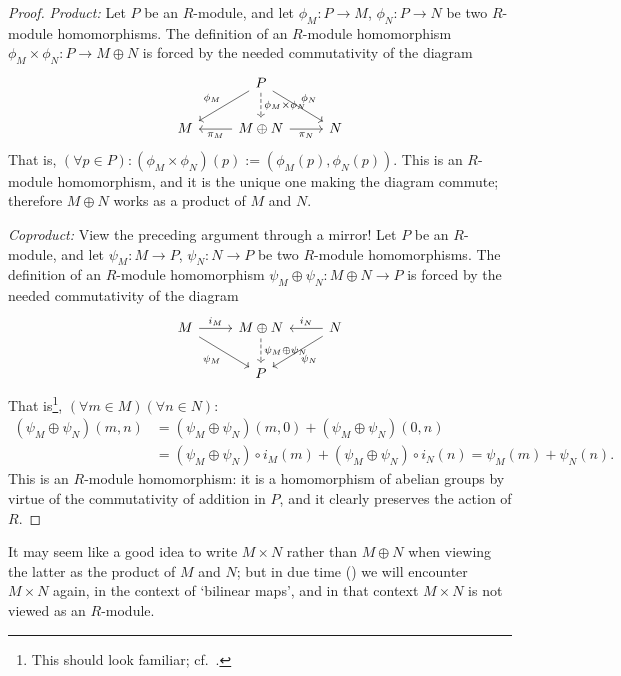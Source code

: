 \begin{proof}
  \emph{Product:} Let $P$ be an $R$-module, and let
  $\phi_M : P \to M$, $\phi_N : P \to N$ be two $R$-module
  homomorphisms. The definition of an $R$-module homomorphism
  $\phi_M \times \phi_N : P \to M \oplus N$ is forced by the needed
  commutativity of the diagram
  \[\begin{tikzcd}
      & P \arrow[dl, "\phi_M"'] \arrow[d, dashed, "\phi_M \times \phi_N"] \arrow[dr, "\phi_N"] & \\
      M & M \oplus N \arrow[l, "\pi_M"] \arrow[r, "\pi_N"'] & N
    \end{tikzcd}\] That is,
  $(\forall p \in P) : (\phi_M \times \phi_N)(p) := (\phi_M(p),
  \phi_N(p))$. This is an $R$-module homomorphism, and it is the
  unique one making the diagram commute; therefore $M \oplus N$ works
  as a product of $M$ and $N$.

  \emph{Coproduct:} View the preceding argument through a mirror! Let
  $P$ be an $R$-module, and let $\psi_M : M \to P$, $\psi_N : N \to P$
  be two $R$-module homomorphisms. The definition of an $R$-module
  homomorphism $\psi_M \oplus \psi_N : M \oplus N \to P$ is forced by
  the needed commutativity of the diagram
  \[\begin{tikzcd}
      M \arrow[r, "i_M"] \arrow[dr, "\psi_M"'] & M \oplus N \arrow[d, dashed, "\psi_M \oplus \psi_N"] & N \arrow[l, "i_N"'] \arrow[dl, "\psi_N"] \\
      & P &
    \end{tikzcd}\] That is\footnote{This should look familiar; cf.\
    .},
  $(\forall m \in M)(\forall n \in N)$:
  \begin{align*}
    (\psi_M \oplus \psi_N)(m, n) &= (\psi_M \oplus \psi_N)(m, 0) + (\psi_M \oplus \psi_N)(0, n) \\
                                 &= (\psi_M \oplus \psi_N) \circ i_M(m) + (\psi_M \oplus \psi_N) \circ i_N(n) = \psi_M(m) + \psi_N(n).
  \end{align*}
  This is an $R$-module homomorphism: it is a homomorphism of abelian
  groups by virtue of the commutativity of addition in $P$, and it
  clearly preserves the action of $R$.
\end{proof}
It may seem like a good idea to write $M \times N$ rather than
$M \oplus N$ when viewing the latter as the product of $M$ and $N$;
but in due time
() we will
encounter $M \times N$ again, in the context of `bilinear maps', and
in that context $M \times N$ is not viewed as an $R$-module.

